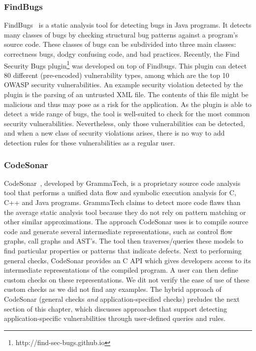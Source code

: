 \subsubsection*{FindBugs}

FindBugs~\cite{Findbugs} is a static analysis tool for detecting bugs in Java programs. It detects many classes of bugs by checking structural bug patterns against a program's source code. These classes of bugs can be subdivided into three main classes: correctness bugs, dodgy confusing code, and bad practices. Recently, the Find Security Bugs plugin\footnote{http://find-sec-bugs.github.io} was developed on top of Findbugs. This plugin can detect 80 different (pre-encoded) vulnerability types, among which are the top 10 OWASP security vulnerabilities. An example security violation detected by the plugin is the parsing of an untrusted XML file. The contents of this file might be malicious and thus may pose as a risk for the application. As the plugin is able to detect a wide range of bugs, the tool is well-suited to check for the most common security vulnerabilities. Nevertheless, only those vulnerabilities can be detected, and when a new class of security violations arises, there is no way to add detection rules for these vulnerabilities as a regular user.

\subsubsection*{CodeSonar}
CodeSonar~\cite{CodeSonar}, developed by GrammaTech, is a proprietary source code analysis tool that performs a unified data flow and symbolic execution analysis for C, C++ and Java programs. GrammaTech claims to detect more code flaws than the average static analysis tool because they do not rely on pattern matching or other similar approximations. The approach CodeSonar uses is to compile source code and generate several intermediate representations, such as control flow graphs, call graphs and AST's. The tool then traverses/queries these models to find particular properties or patterns that indicate defects. Next to performing general checks, CodeSonar provides an C API which gives developers access to its intermediate representations of the compiled program. A user can then define custom checks on these representations. We dit not verify the ease of use of these custom checks as we did not find any examples. The hybrid approach of CodeSonar (general checks \textit{and} application-specified checks) preludes the next section of this chapter, which discusses approaches that support detecting application-specific vulnerabilities through user-defined queries and rules.


